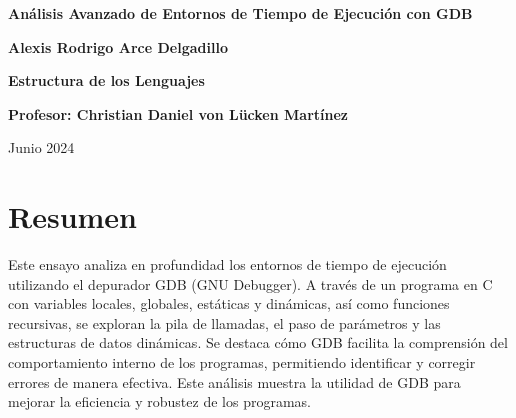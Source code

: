 \documentclass[12pt,a4paper]{article}
\begin{document}
\begin{titlepage}
    \begin{center}
        \vspace*{1cm}
        
        \textbf{\LARGE{Análisis Avanzado de Entornos de Tiempo de Ejecución con GDB}}
        
        \vspace{2cm}
        
        \textbf{\large{Alexis Rodrigo Arce Delgadillo}}
        
        \vfill
        
        \textbf{\large{Estructura de los Lenguajes}}
        
        \vspace{0.5cm}
        
        \textbf{\large{Profesor: Christian Daniel von Lücken Martínez}}
        
        \vspace{1.5cm}
        
        Junio 2024
        
        \vfill
        
    \end{center}
\end{titlepage}
\begin{comment}
\begin{center}
	\textbf{\LARGE{Análisis Avanzado de Entornos de Tiempo de Ejecución con
    GDB}}\\
	\vspace{7mm}
		\textbf{\large{Alexis Rodrigo Arce Delgadillo}}\\
	\vspace{4mm}
	\textbf{\large{Estructura de los lenguajes}}\\
	\textbf{\large{Profesor: Christian Daniel von Lücken Martínez }}\\
	Junio 2024
\end{center}
\end{comment}
\vspace{7mm}


\tableofcontents
\newpage

\section*{\centering Resumen}
Este ensayo analiza en profundidad los entornos de tiempo de ejecución utilizando el depurador GDB (GNU Debugger). A través de un programa en C con variables locales, globales, estáticas y dinámicas, así como funciones recursivas, se exploran la pila de llamadas, el paso de parámetros y las estructuras de datos dinámicas. Se destaca cómo GDB facilita la comprensión del comportamiento interno de los programas, permitiendo identificar y corregir errores de manera efectiva. Este análisis muestra la utilidad de GDB para mejorar la eficiencia y robustez de los programas.
\end{document}
